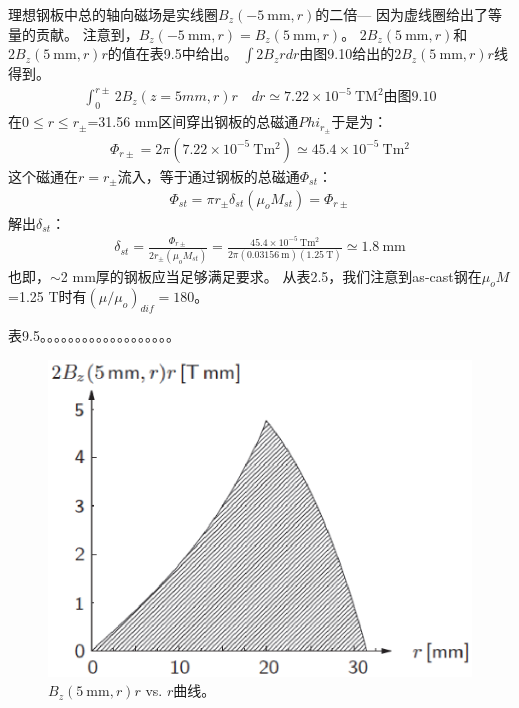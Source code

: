 理想钢板中总的轴向磁场是实线圈$B_z(-5\ \mathrm{mm},r)$的二倍---
因为虚线圈给出了等量的贡献。
注意到，$B_z(-5\ \mathrm{mm},r)=B_z(5\ \mathrm{mm},r)$。
$2 B_z(5\ \mathrm{mm},r)$和$2 B_z(5\ \mathrm{mm},r)r$的值在表9.5中给出。
$\int 2B_z rdr$由图9.10给出的$2B_z(5\ \mathrm{mm},r)r$线得到。
\begin{align*}%
\int_{0}^{r\pm}2B_{z}(z=5mm,r)r\quad dr\simeq 7.22\times10^{-5}\ \mathrm{TM^{2}}\mbox{由图9.10}
\end{align*}
在$0\le r\le r_{\pm}$=31.56 mm区间穿出钢板的总磁通$Phi_{r_{\pm}}$于是为：
\begin{align*}%
\Phi_{r\pm}=2\pi(7.22\times 10^{-5}\ \mathrm{Tm^{2}})\simeq 45.4\times 10^{-5}\ \mathrm{Tm^{2}}
\end{align*}
这个磁通在$r=r_{\pm}$流入，等于通过钢板的总磁通$\Phi_{st}$：
\begin{align*}%
\Phi_{st}=\pi r_{\pm}\delta_{st}(\mu_{o}M_{st})=\Phi_{r\pm}
\end{align*}
解出$\delta_{st}$：
\begin{align*}%
\delta_{st}=\frac{\Phi_{r\pm}}{2r_{\pm}(\mu_{o}M_{st})}=\frac{45.4\times 10^{-5}\ \mathrm{Tm^{2}}}{2\pi(0.03156\ \mathrm{m})(1.25\ \mathrm{T})}\simeq 1.8\ \mathrm{mm}
\end{align*}
也即，$\sim$2 mm厚的钢板应当足够满足要求。
从表2.5，我们注意到as-cast钢在$\mu_o M$=1.25 T时有$(\mu/\mu_o)_{dif}=180$。

表9.5。。。。。。。。。。。。。。。。。。。

\begin{figure}
	\centering
	\includegraphics[scale=0.6]{chpt9/figs/fig9.10.eps}
	\caption{$B_z(5\ \mathrm{mm},r)r$ vs. $r$曲线。}
\end{figure}

